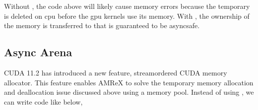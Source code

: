 \documentclass[letterpaper,10pt,english]{sphinxmanual}
\begin{document}
\begin{sphinxVerbatim}[commandchars=\\\{\}]
     
      
    
     
      

\end{sphinxVerbatim}

\sphinxAtStartPar
Without , the code above will likely cause memory errors
because the temporary  is deleted on cpu before the
gpu kernels use its memory.  With , the ownership of the
memory is transferred to  that is guaranteed to be
async\sphinxhyphen{}safe.


\subsection{Async Arena}
\label{\detokenize{GPU:async-arena}}
\sphinxAtStartPar
CUDA 11.2 has introduced a new feature, stream\sphinxhyphen{}ordered CUDA memory
allocator.  This feature enables AMReX to solve the temporary memory
allocation and deallocation issue discussed above using a memory pool.
Instead of using , we can write code like below,
\end{document}

